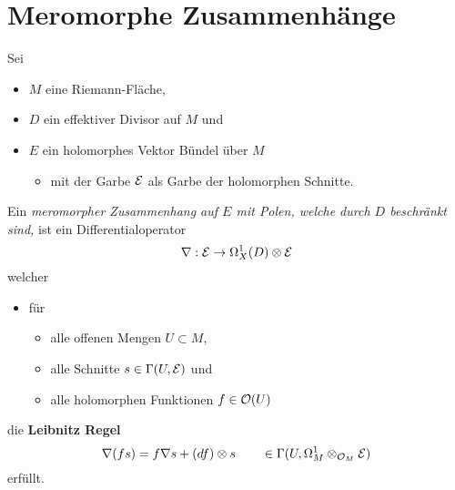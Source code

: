 \section{Meromorphe Zusammenhänge} %
Sei
\begin{itemize}
  \item $M$ eine Riemann-Fläche,
  \item $D$ ein effektiver Divisor auf $M$ und
  \item $E$ ein holomorphes Vektor Bündel über $M$
    \begin{itemize}
      \item mit der Garbe $\mathcal{E}$ als Garbe der holomorphen Schnitte.
    \end{itemize}
\end{itemize}
\begin{defn}
  Ein \emph{meromorpher Zusammenhang auf $E$ mit Polen, welche durch $D$
  beschränkt sind,} ist ein Differentialoperator
  \[
    \nabla:\mathcal{E}\to\Omega_X^1(D)\otimes\mathcal{E}
  \]
  welcher
  \begin{itemize}
    \item für
      \begin{itemize}
        \item alle offenen Mengen $U\subset M$,
        \item alle Schnitte $s\in\Gamma(U,\mathcal{E})$ und
        \item alle holomorphen Funktionen $f\in\mathcal{O}(U)$
      \end{itemize}
  \end{itemize}
  die \textbf{Leibnitz Regel}
  \[
    \nabla(fs)=f\nabla s+(df)\otimes s
    \qquad
    \in\Gamma(U,\Omega_M^1\otimes_{\mathcal{O}_M}\mathcal{E})
  \]
  erfüllt.
  \begin{comment}
    \begin{defn}
      Ein Zusammenhang heiß \emph{flach} oder \emph{integrabel} falls
      \begin{itemize}
        \item seine Krümmung $R_\nabla\equiv0$
          wobei
          \begin{itemize}
            \item $R_\nabla
              :=\nabla\circ\nabla:\cE\to\Omega_M^2\otimes_{\cO_M}\cE$
          \end{itemize}
      \end{itemize}
      \begin{rem}[ \cite{sabbah2007isomonodromic} Rem 0.12.5]
        Falls $\dim(M)=1$ ist jeder Zusammenhang flach.
      \end{rem}
    \end{defn}
  \end{comment}
\end{defn}
